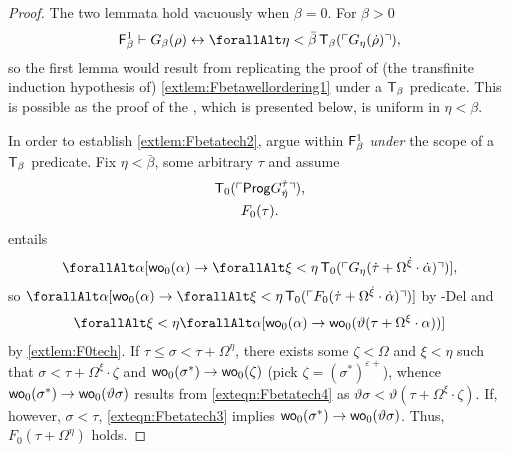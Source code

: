 \documentclass[UKenglish,cleveref,DIV=12]{scrartcl}
\let\forall\forallAlt
\theoremstyle{definition}
\theoremstyle{definition}
\begin{document}
\begin{proof}
The two lemmata hold vacuously when $\beta=0$. For $\beta>0$
\begin{align*}
 \F_\beta^1\proves G_\beta(\rho)\equi \forall\eta<\bar\beta\,\T_\beta(\gn{G_\eta(\dot\rho)}),
\end{align*}
so the first lemma would result from replicating the proof of (the transfinite
induction hypothesis of) \cref{extlem:Fbetawellordering1} under a $\mathsf{T}_\beta$
predicate. This is possible as the proof of the , which is presented below, is
uniform in $\eta<\beta$.

In order to establish \cref{extlem:Fbetatech2}, argue within $\mathsf{F}_\beta^1$ {\em under} the scope of a $\mathsf{T}_\beta$ predicate. Fix $\eta<\bar\beta$, some arbitrary $\tau$ and assume
\begin{gather}
  \mathsf{T}_0(\ulcorner{\mathsf{Prog}G_{\dot \eta}^{\dot\tau}}\urcorner),\label{exteqn:Fbetatech2}\\
  F_0(\tau).\label{exteqn:Fbetatech3}
\end{gather}
 entails
\begin{gather*}
  \forall\alpha [\wo_0(\alpha)\rightarrow \forall\xi<\eta\,\T_0(\gn{G_\eta(\dot\tau+\Omega^{\dot\xi}\cdot\dot\alpha)})],
\end{gather*}
so $\forall\alpha[\wo_0(\alpha)\rightarrow \forall\xi<\eta\,\T_0(\gn{F_0(\dot\tau+\Omega^{\dot\xi}\cdot\dot\alpha)})]$ by -Del and
\begin{align}\label{exteqn:Fbetatech4}
  \forall\xi<\eta\forall\alpha [\wo_0(\alpha)\rightarrow\wo_0(\vartheta(\tau+\Omega^\xi\cdot\alpha))]
\end{align}
by \cref{extlem:F0tech}. If $\tau\le\sigma<\tau+\Omega^\eta$, there exists some
$\zeta<\Omega$ and $\xi<\eta$ such that $\sigma<\tau+\Omega^\xi\cdot\zeta$
and $\mathsf{wo}_0(\sigma^*)\rightarrow \mathsf{wo}_0(\zeta)$ (pick
$\zeta=(\sigma^*)^{\varepsilon+}$), whence $\mathsf{wo}_0(\sigma^*)\rightarrow
\mathsf{wo}_0(\vartheta\sigma)$ results from \cref{exteqn:Fbetatech4} as
$\vartheta\sigma<\vartheta(\tau+\Omega^\xi\cdot\zeta)$. If, however,
$\sigma<\tau$, \cref{exteqn:Fbetatech3} implies $\mathsf{wo}_0(\sigma^*)\rightarrow
\mathsf{wo}_0(\vartheta\sigma)$. Thus, $F_0(\tau+\Omega^\eta)$ holds.
\end{proof}
\end{document}
